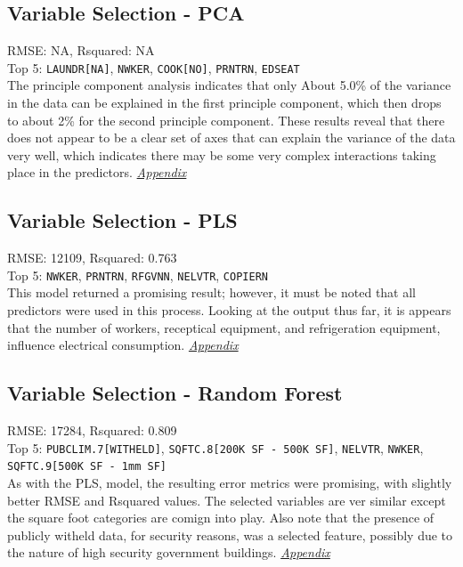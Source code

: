 \subsection{Variable Selection - PCA}
RMSE: NA, Rsquared: NA\\
Top 5: \lstinline{LAUNDR[NA]}, \lstinline{NWKER}, \lstinline{COOK[NO]}, \lstinline{PRNTRN}, \lstinline{EDSEAT}
\\[0.1in]
\indent The principle component analysis indicates that only About 5.0\% of the variance in the data can be explained in the first principle component, which then drops to about 2\% for the second principle component.  These results reveal that there does not appear to be a clear set of axes that can explain the variance of the data very well, which indicates there may be some very complex interactions taking place in the predictors.  \textit{\hyperref[appendix:electricity:pca]{Appendix}}

\subsection{Variable Selection - PLS}
RMSE: 12109, Rsquared: 0.763\\
Top 5: \lstinline{NWKER}, \lstinline{PRNTRN}, \lstinline{RFGVNN}, \lstinline{NELVTR}, \lstinline{COPIERN}
\\[0.1in]
\indent This model returned a promising result; however, it must be noted that all predictors were used in this process.  Looking at the output thus far, it is appears that the number of workers, receptical equipment, and refrigeration equipment, influence electrical consumption.  \textit{\hyperref[appendix:electricity:pls]{Appendix}}

\subsection{Variable Selection - Random Forest}
RMSE: 17284, Rsquared: 0.809\\
Top 5: \lstinline{PUBCLIM.7[WITHELD]}, \lstinline{SQFTC.8[200K SF - 500K SF]}, \lstinline{NELVTR}, \lstinline{NWKER},  \lstinline{SQFTC.9[500K SF - 1mm SF]}
\\[0.1in]
\indent As with the PLS, model, the resulting error metrics were promising, with slightly better RMSE and Rsquared values.  The selected variables are ver similar except the square foot categories are comign into play.  Also note that the presence of publicly witheld data, for security reasons, was a selected feature, possibly due to the nature of high security government buildings.  \textit{\hyperref[appendix:electricity:rf]{Appendix}}

